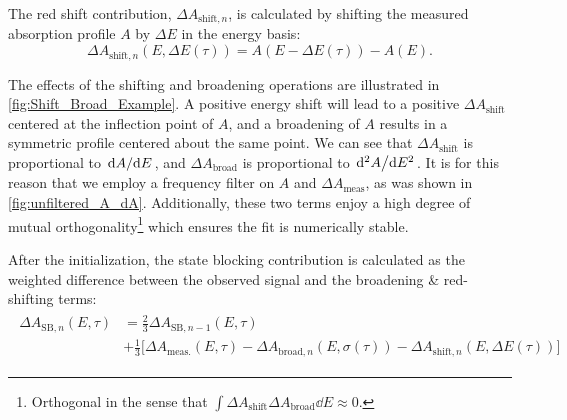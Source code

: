 The red shift contribution, $\Delta A_{\textrm{shift},n}$, is calculated by shifting the measured absorption profile $A$ by $\Delta E$ in the energy basis:
\begin{equation}
\Delta A_{\textrm{shift},n}(E, \Delta E(\tau)) = A(E- \Delta E(\tau)) - A(E).
\label{eqn:dA_Shift}
\end{equation}

The effects of the shifting and broadening operations are illustrated in \cref{fig:Shift_Broad_Example}. A positive energy shift will lead to a positive $\Delta A_{\textrm{shift}}$ centered at the inflection point of $A$, and a broadening of $A$ results in a symmetric profile centered about the same point. We can see that $\Delta A_{\textrm{shift}}$ is proportional to $\dv*{A}{E}$, and $\Delta A_{\textrm{broad}}$ is proportional to $\dv*[2]{A}{E}$. It is for this reason that we employ a frequency filter on $A$ and $\Delta A_{\textrm{meas}}$, as was shown in \cref{fig:unfiltered_A_dA}. Additionally, these two terms enjoy a high degree of mutual orthogonality\footnote{Orthogonal in the sense that $\int \Delta A_{\textrm{shift}} \Delta A_{\textrm{broad}} \dd{E} \approx 0$.} which ensures the fit is numerically stable.

After the initialization, the state blocking contribution is calculated as the weighted difference between the observed signal and the broadening \& red-shifting terms:
\begin{align}
\begin{split}
\Delta A_{\textrm{SB},n}(E,\tau) &= \frac{2}{3} \Delta A_{\textrm{SB},n-1}(E,\tau) \\
&+ \frac{1}{3} \Big[ \Delta A_{\textrm{meas.}}(E,\tau) - \Delta A_{\textrm{broad},n}(E, \sigma(\tau))- \Delta A_{\textrm{shift},n}(E,\Delta E(\tau)) \Big]
\end{split}
\end{align}

